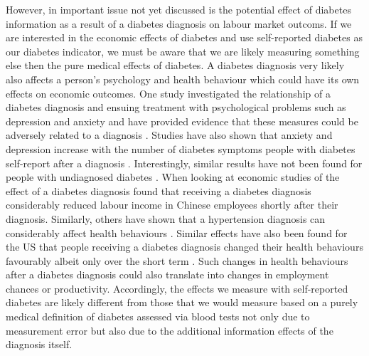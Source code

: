 However, in important issue not yet discussed is the potential effect of diabetes information as a result of a diabetes diagnosis on labour market outcoms. If we are interested in the economic effects of diabetes and use self-reported diabetes as our diabetes indicator, we must
be aware that we are likely measuring something else then the pure
medical effects of diabetes. A diabetes diagnosis very likely also affects
a person's psychology and health behaviour which could have its own
effects on economic outcomes. One study investigated the relationship of a diabetes diagnosis and ensuing treatment with psychological problems such as depression and anxiety and have provided evidence that these measures could be adversely related to a diagnosis \citep{17003303}. Studies have also shown that anxiety and depression increase with the number of diabetes symptoms people with diabetes self-report after a diagnosis \cite{Paddison_2011}. Interestingly, similar results have not been found for people with undiagnosed diabetes \cite{Nouwen_2011}. When looking at economic studies of the effect of a diabetes diagnosis \citet{Liu2014} found that receiving a diabetes diagnosis
considerably reduced labour income in Chinese employees shortly after
their diagnosis. Similarly, others have shown that a hypertension
diagnosis can considerably affect health behaviours \citep{Zhao2013a}.
Similar effects have also been found for the US that people receiving
a diabetes diagnosis changed their health behaviours favourably albeit
only over the short term \citep{Slade2012}. Such changes in health
behaviours after a diabetes diagnosis could also translate into changes
in employment chances or productivity. Accordingly, the effects we measure with self-reported diabetes are
likely different from those that we would measure based on a purely
medical definition of diabetes assessed via blood tests not only due to measurement error but also due to the additional information effects of the diagnosis itself.


  
  
  
  
  
  
  
  
  